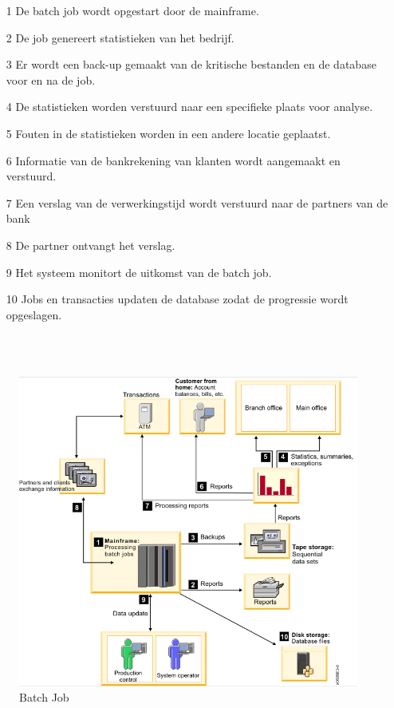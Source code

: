 \begin{itemize}
    \item[1] De batch job wordt opgestart door de mainframe.
    \item[2] De job genereert statistieken van het bedrijf.
    \item[3] Er wordt een back-up gemaakt van de kritische bestanden en de database voor en na de job.
    \item[4] De statistieken worden verstuurd naar een specifieke plaats voor analyse.
    \item[5] Fouten in de statistieken worden in een andere locatie geplaatst.
    \item[6] Informatie van de bankrekening van klanten wordt aangemaakt en verstuurd.
    \item[7] Een verslag van de verwerkingstijd wordt verstuurd naar de partners van de bank
    \item[8] De partner ontvangt het verslag.
    \item[9] Het systeem monitort de uitkomst van de batch job.
    \item[10] Jobs en transacties updaten de database zodat de progressie wordt opgeslagen.
\end{itemize}
\\ \\
\begin{figure}[p!]
    \centering
    \includegraphics[width=400pt]{./graphics/BatchJobVB.png}
    \caption{Batch Job \autocite{IBMb}}
    \label{fig:batch}
\end{figure}

